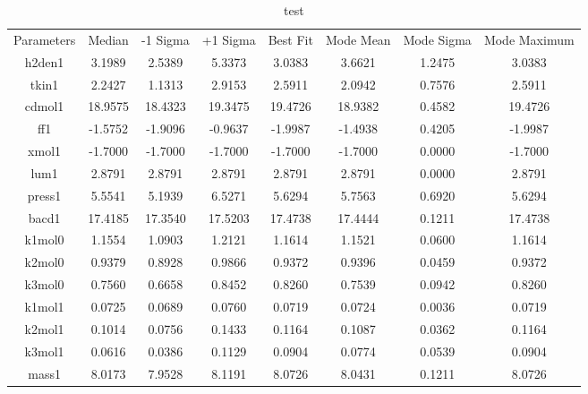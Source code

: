 \begin{table}
\caption{test}
\begin{tabular}{cccccccc}
Parameters & Median & -1 Sigma & +1 Sigma & Best Fit & Mode Mean & Mode Sigma & Mode Maximum \\
h2den1 & 3.1989 & 2.5389 & 5.3373 & 3.0383 & 3.6621 & 1.2475 & 3.0383 \\
tkin1 & 2.2427 & 1.1313 & 2.9153 & 2.5911 & 2.0942 & 0.7576 & 2.5911 \\
cdmol1 & 18.9575 & 18.4323 & 19.3475 & 19.4726 & 18.9382 & 0.4582 & 19.4726 \\
ff1 & -1.5752 & -1.9096 & -0.9637 & -1.9987 & -1.4938 & 0.4205 & -1.9987 \\
xmol1 & -1.7000 & -1.7000 & -1.7000 & -1.7000 & -1.7000 & 0.0000 & -1.7000 \\
lum1 & 2.8791 & 2.8791 & 2.8791 & 2.8791 & 2.8791 & 0.0000 & 2.8791 \\
press1 & 5.5541 & 5.1939 & 6.5271 & 5.6294 & 5.7563 & 0.6920 & 5.6294 \\
bacd1 & 17.4185 & 17.3540 & 17.5203 & 17.4738 & 17.4444 & 0.1211 & 17.4738 \\
k1mol0 & 1.1554 & 1.0903 & 1.2121 & 1.1614 & 1.1521 & 0.0600 & 1.1614 \\
k2mol0 & 0.9379 & 0.8928 & 0.9866 & 0.9372 & 0.9396 & 0.0459 & 0.9372 \\
k3mol0 & 0.7560 & 0.6658 & 0.8452 & 0.8260 & 0.7539 & 0.0942 & 0.8260 \\
k1mol1 & 0.0725 & 0.0689 & 0.0760 & 0.0719 & 0.0724 & 0.0036 & 0.0719 \\
k2mol1 & 0.1014 & 0.0756 & 0.1433 & 0.1164 & 0.1087 & 0.0362 & 0.1164 \\
k3mol1 & 0.0616 & 0.0386 & 0.1129 & 0.0904 & 0.0774 & 0.0539 & 0.0904 \\
mass1 & 8.0173 & 7.9528 & 8.1191 & 8.0726 & 8.0431 & 0.1211 & 8.0726 \\
\end{tabular}
\end{table}
